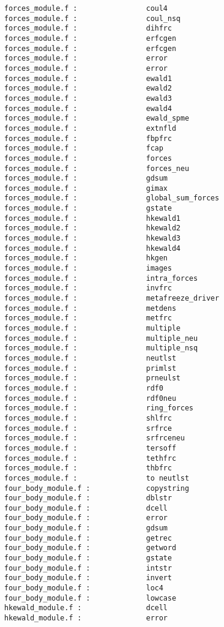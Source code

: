 \begin{verbatim}
forces_module.f :                coul4 
forces_module.f :                coul_nsq 
forces_module.f :                dihfrc 
forces_module.f :                erfcgen 
forces_module.f :                erfcgen 
forces_module.f :                error 
forces_module.f :                error 
forces_module.f :                ewald1 
forces_module.f :                ewald2 
forces_module.f :                ewald3 
forces_module.f :                ewald4 
forces_module.f :                ewald_spme 
forces_module.f :                extnfld 
forces_module.f :                fbpfrc 
forces_module.f :                fcap 
forces_module.f :                forces 
forces_module.f :                forces_neu 
forces_module.f :                gdsum 
forces_module.f :                gimax 
forces_module.f :                global_sum_forces 
forces_module.f :                gstate 
forces_module.f :                hkewald1 
forces_module.f :                hkewald2 
forces_module.f :                hkewald3 
forces_module.f :                hkewald4 
forces_module.f :                hkgen 
forces_module.f :                images 
forces_module.f :                intra_forces 
forces_module.f :                invfrc 
forces_module.f :                metafreeze_driver 
forces_module.f :                metdens 
forces_module.f :                metfrc 
forces_module.f :                multiple 
forces_module.f :                multiple_neu 
forces_module.f :                multiple_nsq 
forces_module.f :                neutlst 
forces_module.f :                primlst 
forces_module.f :                prneulst 
forces_module.f :                rdf0 
forces_module.f :                rdf0neu 
forces_module.f :                ring_forces 
forces_module.f :                shlfrc 
forces_module.f :                srfrce 
forces_module.f :                srfrceneu 
forces_module.f :                tersoff 
forces_module.f :                tethfrc 
forces_module.f :                thbfrc 
forces_module.f :                to neutlst 
four_body_module.f :             copystring 
four_body_module.f :             dblstr
four_body_module.f :             dcell 
four_body_module.f :             error 
four_body_module.f :             gdsum 
four_body_module.f :             getrec 
four_body_module.f :             getword 
four_body_module.f :             gstate 
four_body_module.f :             intstr
four_body_module.f :             invert 
four_body_module.f :             loc4
four_body_module.f :             lowcase 
hkewald_module.f :               dcell 
hkewald_module.f :               error 

\end{verbatim}
